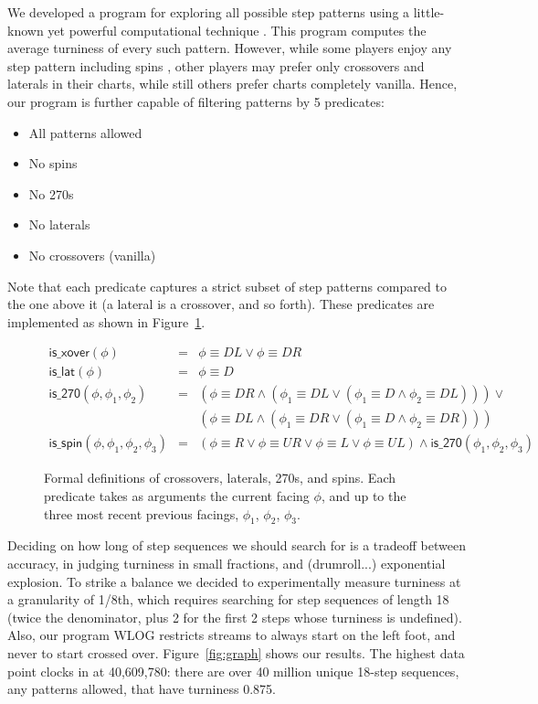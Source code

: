 \documentclass[10pt]{sigplanconf}
\begin{document}
We developed a program for exploring all possible step patterns using a little-known yet powerful computational technique \cite{bruteforce1,bruteforce2}.
This program computes the average turniness of every such pattern.
However, while some players enjoy any step pattern including spins \cite{alanv},
other players may prefer only crossovers and laterals in their charts,
while still others prefer charts completely vanilla.
Hence, our program is further capable of filtering patterns by 5 predicates:
\begin{itemize}
	\item All patterns allowed
	\item No spins
	\item No 270s
	\item No laterals
	\item No crossovers (vanilla)
\end{itemize}
Note that each predicate captures a strict subset of step patterns compared to the one above it (a lateral is a crossover, and so forth).
These predicates are implemented as shown in Figure~\ref{fig:eqn}.

\begin{figure}
	\begin{eqnarray*}
		\mathsf{is\_xover}(\phi) &=& \phi \equiv DL \vee \phi \equiv DR \\
		\mathsf{is\_lat}(\phi) &=& \phi \equiv D \\
		\mathsf{is\_270}(\phi, \phi_1, \phi_2) &=& (\phi \equiv DR \wedge (\phi_1 \equiv DL \vee (\phi_1 \equiv D \wedge \phi_2 \equiv DL))) \vee \\
                                              & & (\phi \equiv DL \wedge (\phi_1 \equiv DR \vee (\phi_1 \equiv D \wedge \phi_2 \equiv DR))) \\
		\mathsf{is\_spin}(\phi, \phi_1, \phi_2, \phi_3) &=& (\phi \equiv R \vee \phi \equiv UR \vee \phi \equiv L \vee \phi \equiv UL) \wedge \mathsf{is\_270}(\phi_1, \phi_2, \phi_3)
	\end{eqnarray*}
	\caption{Formal definitions of crossovers, laterals, 270s, and spins. Each predicate takes as arguments the current facing $\phi$, and up to the three most recent previous facings, $\phi_1$, $\phi_2$, $\phi_3$.}
	\label{fig:eqn}
\end{figure}

Deciding on how long of step sequences we should search for is a tradeoff between accuracy, in judging turniness in small fractions, and (drumroll...) exponential explosion.
To strike a balance we decided to experimentally measure turniness at a granularity of 1/8th, which requires searching for step sequences of length 18 (twice the denominator, plus 2 for the first 2 steps whose turniness is undefined).
Also, our program WLOG restricts streams to always start on the left foot, and never to start crossed over.
Figure~\ref{fig:graph} shows our results.
The highest data point clocks in at 40,609,780: there are over 40 million unique 18-step sequences, any patterns allowed, that have turniness 0.875.
\end{document}
